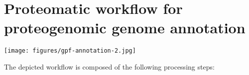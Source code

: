 \chapter{Proteomatic workflow for proteogenomic genome annotation}
\label{appendix-b}


\vfill
\texttt{[image: figures/gpf-annotation-2.jpg]}
\vfill
\clearpage



The depicted workflow is composed of the following processing steps:

